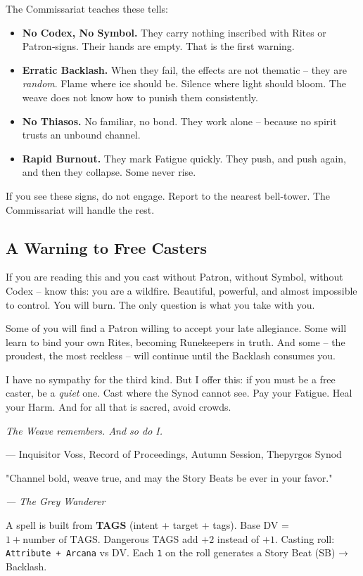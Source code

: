 \documentclass[10pt,a5paper]{book}
\begin{document}
The Commissariat teaches these tells:

\begin{itemize}
    \item \textbf{No Codex, No Symbol.} They carry nothing inscribed with Rites or Patron‑signs. Their hands are empty. That is the first warning.
    \item \textbf{Erratic Backlash.} When they fail, the effects are not thematic -- they are \textit{random}. Flame where ice should be. Silence where light should bloom. The weave does not know how to punish them consistently.
    \item \textbf{No Thiasos.} No familiar, no bond. They work alone -- because no spirit trusts an unbound channel.
    \item \textbf{Rapid Burnout.} They mark Fatigue quickly. They push, and push again, and then they collapse. Some never rise.
\end{itemize}

If you see these signs, do not engage. Report to the nearest bell‑tower. The Commissariat will handle the rest.

\subsection{A Warning to Free Casters}

If you are reading this and you cast without Patron, without Symbol, without Codex -- know this: you are a wildfire. Beautiful, powerful, and almost impossible to control. You will burn. The only question is what you take with you.

Some of you will find a Patron willing to accept your late allegiance. Some will learn to bind your own Rites, becoming Runekeepers in truth. And some -- the proudest, the most reckless -- will continue until the Backlash consumes you.

I have no sympathy for the third kind. But I offer this: if you must be a free caster, be a \textit{quiet} one. Cast where the Synod cannot see. Pay your Fatigue. Heal your Harm. And for all that is sacred, avoid crowds.

\textit{The Weave remembers. And so do I.}

--- Inquisitor Voss, Record of Proceedings, Autumn Session, Thepyrgos Synod

\epigraph{"Channel bold, weave true, and may the Story Beats be ever in your favor."}{\textit{--- The Grey Wanderer}}

A spell is built from \textbf{TAGS} (intent + target + tags). Base DV = \(1 + \text{number of TAGS}\). Dangerous TAGS add \(+2\) instead of \(+1\). Casting roll: \texttt{Attribute + Arcana} vs DV. Each \texttt{1} on the roll generates a Story Beat (SB) → Backlash.
\end{document}
